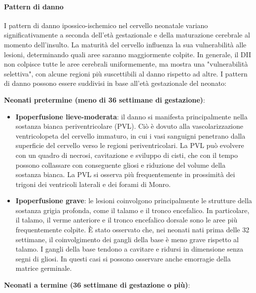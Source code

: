 \paragraph{Pattern di danno} I pattern di danno ipossico-ischemico nel cervello neonatale variano significativamente a seconda dell'età gestazionale e della maturazione cerebrale al momento dell'insulto. La maturità del cervello influenza la sua vulnerabilità alle lesioni, determinando quali aree saranno maggiormente colpite. In generale, il DII non colpisce tutte le aree cerebrali uniformemente, ma mostra una "vulnerabilità selettiva", con alcune regioni più suscettibili al danno rispetto ad altre. I pattern di danno possono essere suddivisi in base all'età gestazionale del neonato:

\textbf{Neonati pretermine (meno di 36 settimane di gestazione)}:

\begin{itemize}
	\tightlist
	\item
	\textbf{Ipoperfusione lieve-moderata}: il danno si manifesta principalmente nella sostanza bianca periventricolare (PVL). Ciò è dovuto alla vascolarizzazione ventricolopeta del cervello immaturo, in cui i vasi sanguigni penetrano dalla superficie del cervello verso le regioni periventricolari. La PVL può evolvere con un quadro di necrosi, cavitazione e sviluppo di cisti, che con il tempo possono collassare con conseguente gliosi e riduzione del volume della sostanza bianca. La PVL si osserva più frequentemente in prossimità dei trigoni dei ventricoli laterali e dei forami di Monro.
	\item
	\textbf{Ipoperfusione grave}: le lesioni coinvolgono principalmente le strutture della sostanza grigia profonda, come il talamo e il tronco encefalico. In particolare, il talamo, il verme anteriore e il tronco encefalico dorsale sono le aree più frequentemente colpite. È stato osservato che, nei neonati nati prima delle 32 settimane, il coinvolgimento dei gangli della base è meno grave rispetto al talamo. I gangli della base tendono a cavitare e ridursi in dimensione senza segni di gliosi. In questi casi si possono osservare anche emorragie della matrice germinale.
\end{itemize}

\textbf{Neonati a termine (36 settimane di gestazione o più)}:


